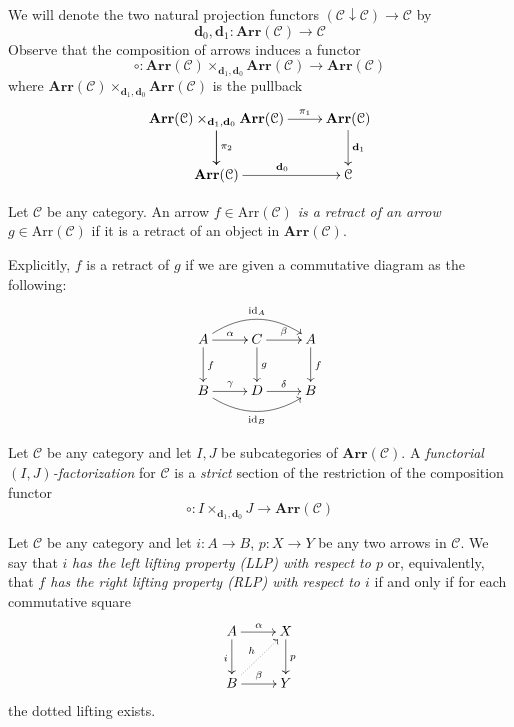 \begin{refsection}
\begin{rmk}
We will denote the two natural projection functors $(\mathcal C \downarrow \mathcal C) \to \mathcal C$ by
\[
\mathbf d_0, \mathbf d_1 \colon \mathbf{Arr}(\mathcal C) \to \mathcal C
\]
Observe that the composition of arrows induces a functor
\[
\circ \colon \mathbf{Arr}(\mathcal C) \times_{\mathbf d_1, \mathbf d_0} \mathbf{Arr}(\mathcal C) \to \mathbf{Arr}(\mathcal C)
\]
where $\mathbf{Arr}(\mathcal C) \times_{\mathbf d_1, \mathbf d_0} \mathbf{Arr}(\mathcal C)$ is the pullback
\[
\xymatrix{
\mathbf{Arr}(\mathcal C) \times_{\mathbf d_1, \mathbf d_0} \mathbf{Arr}(\mathcal C) \ar[d] \ar[r]^-{\pi_1} \ar[d]^{\pi_2} & \mathbf{Arr}(\mathcal C) \ar[d]^{\mathbf d_1} \\ \mathbf{Arr}(\mathcal C) \ar[r]^{\mathbf d_0} & \mathcal C
}
\]
\end{rmk}

\begin{defin}
Let $\mathcal C$ be any category. An arrow $f \in \mathrm{Arr}(\mathcal C)$ \emph{is a retract of an arrow $g \in \mathrm{Arr}(\mathcal C)$} if it is a retract of an object in $\mathbf{Arr}(\mathcal C)$. 
\end{defin}

Explicitly, $f$ is a retract of $g$ if we are given a commutative diagram as the following:
\[
\xymatrix{
A \ar@/^1.25pc/[rr]^{\mathrm{id}_A} \ar[d]^f \ar[r]^\alpha & C \ar[d]^g \ar[r]^\beta & A \ar[d]^f \\ B \ar[r]^\gamma \ar@/_1.2pc/[rr]_{\mathrm{id}_B} & D \ar[r]^\delta & B
}
\]

\begin{defin}
Let $\mathcal C$ be any category and let $I,J$ be subcategories of $\mathbf{Arr}(\mathcal C)$.
A \emph{functorial $(I,J)$-factorization} for $\mathcal C$ is a \emph{strict} section of the restriction of the composition functor
\[
\circ \colon I \times_{\mathbf d_1,\mathbf d_0} J \to \mathbf{Arr}(\mathcal C)
\]
\end{defin}

\begin{defin} \label{def LLP RLP}
Let $\mathcal C$ be any category and let $i \colon A \to B$, $p \colon X \to Y$ be any two arrows in $\mathcal C$. We say that $i$ \emph{has the left lifting property (\textup{LLP}) with respect to $p$} or, equivalently, that \emph{$f$ has the right lifting property (\textup{RLP}) with respect to $i$} if and only if for each commutative square
\[
\xymatrix{ A \ar[d]_i \ar[r]^\alpha & X \ar[d]^p \\ B \ar[r]^\beta \ar@{.>}[ur]^h & Y }
\]
the dotted lifting exists.
\end{defin}


\end{refsection}
